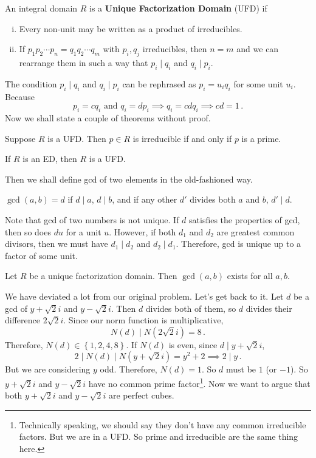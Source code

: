 \documentclass[11pt]{scrartcl}
\begin{document}
\begin{defn}
An integral domain \(R\) is a \textbf{Unique Factorization Domain} (UFD) if
\begin{enumerate}[(i)]
\item Every non-unit may be written as a product of irreducibles.
\item If \(p_1p_2 \cdots p_n = q_1 q_2 \cdots q_m\) with \(p_i, q_j\) irreducibles, then \(n=m\) and we can rearrange them in such a way that \(p_i \mid q_i\) and \(q_i \mid p_i\).
\end{enumerate}
\end{defn}
The condition \(p_i \mid q_i\) and \(q_i \mid p_i\) can be rephrased as \(p_i = u_i q_i\) for some unit \(u_i\). Because
\[ p_i = c q_i \text{ and } q_i = d p_i \implies q_i = cd q_i \implies cd = 1 \,. \]
Now we shall state a couple of theorems without proof.
\begin{theorem}
Suppose \(R\) is a UFD. Then \(p\in R\) is irreducible if and only if \(p\) is a prime.
\end{theorem}
\begin{theorem}
If \(R\) is an ED, then \(R\) is a UFD.
\end{theorem}
Then we shall define gcd of two elements in the old-fashioned way.
\begin{defn}
\(\gcd \left(a,b\right) = d\) if \(d \mid a\), \(d \mid b\), and if any other \(d'\) divides both \(a\) and \(b\), \(d' \mid d\).
\end{defn}
Note that gcd of two numbers is not unique. If \(d\) satisfies the properties of gcd, then so does \(du\) for a unit \(u\). However, if both \(d_1\) and \(d_2\) are greatest common divisors, then we must have \(d_1 \mid d_2\) and \(d_2 \mid d_1\). Therefore, gcd is unique up to a factor of some unit.
\begin{proposition}
Let \(R\) be a unique factorization domain. Then \(\gcd \left(a,b\right) \) exists for all \(a,b\). %
\end{proposition}

We have deviated a lot from our original problem. Let's get back to it. Let \(d\) be a gcd of \(y+ \sqrt{2}i\) and \(y - \sqrt{2}i\). Then \(d\) divides both of them, so \(d\) divides their difference \(2 \sqrt 2i\). Since our norm function is multiplicative,
\[ N \left(d\right) \mid N \left(2 \sqrt 2i\right) = 8 \,. \]
Therefore, \(N \left(d\right) \in \left\{1,2,4,8\right\} \). If \(N \left(d\right) \) is even, since \(d \mid y+ \sqrt 2i\),
\[ 2 \mid N \left(d\right) \mid N \left(y+ \sqrt 2i\right) = y^2 + 2 \implies 2 \mid y \,. \]
But we are considering \(y\) odd. Therefore, \(N \left(d\right) = 1\). So \(d\) must be \(1\) (or \(-1\)). So \(y + \sqrt 2i\) and \(y - \sqrt 2i\) have no common prime factor\footnote{Technically speaking, we should say they don't have any common irreducible factors. But we are in a UFD. So prime and irreducible are the same thing here.}. Now we want to argue that both \(y+\sqrt 2i\) and \(y-\sqrt 2i\) are perfect cubes.
\end{document}
